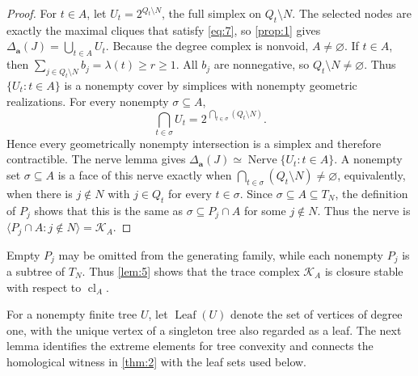 \documentclass[11pt]{amsart}
\newtheorem{lemma}[theorem]{Lemma}
\theoremstyle{definition}
\newcommand{\cl}{\operatorname{cl}}
\newcommand{\ex}{\operatorname{ex}}
\newcommand{\conv}{\operatorname{conv}}
\begin{document}
\begin{proof}
For $t\in A$, let $U_t=2^{Q_t\setminus N}$, the full simplex on $Q_t\setminus N$. The selected nodes are exactly the maximal cliques that satisfy \cref{eq:7}, so \cref{prop:1} gives $\Delta_{\mathbf a}(J)=\bigcup_{t\in A}U_t$. Because the degree complex is nonvoid, $A\ne\varnothing$. If $t\in A$, then $\sum_{j\in Q_t\setminus N}b_j=\lambda(t)\ge r\ge1$. All $b_j$ are nonnegative, so $Q_t\setminus N\ne\varnothing$. Thus $\{U_t:t\in A\}$ is a nonempty cover by simplices with nonempty geometric realizations. For every nonempty $\sigma\subseteq A$,
\[
\bigcap_{t\in\sigma}U_t
=
2^{\,\bigcap_{t\in\sigma}(Q_t\setminus N)}.
\]
Hence every geometrically nonempty intersection is a simplex and therefore contractible. The nerve lemma \cite[Theorem~10.6]{Bjorner} gives $\Delta_{\mathbf a}(J)\simeq\operatorname{Nerve}\{U_t:t\in A\}$. A nonempty set $\sigma\subseteq A$ is a face of this nerve exactly when $\bigcap_{t\in\sigma}(Q_t\setminus N)\ne\varnothing$, equivalently, when there is $j\notin N$ with $j\in Q_t$ for every $t\in\sigma$. Since $\sigma\subseteq A\subseteq T_N$, the definition of $P_j$ shows that this is the same as $\sigma\subseteq P_j\cap A$ for some $j\notin N$. Thus the nerve is $\langle P_j\cap A:j\notin N\rangle=\mathcal K_A$.
\end{proof}

Empty $P_j$ may be omitted from the generating family, while each nonempty $P_j$ is a subtree of $T_N$. Thus \cref{lem:5} shows that the trace complex $\mathcal K_A$ is closure stable with respect to $\cl_A$.

For a nonempty finite tree $U$, let $\operatorname{Leaf}(U)$ denote the set of vertices of degree one, with the unique vertex of a singleton tree also regarded as a leaf. The next lemma identifies the extreme elements for tree convexity and connects the homological witness in \cref{thm:2} with the leaf sets used below.

\end{document}
